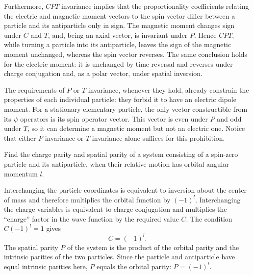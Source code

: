 Furthermore, $CPT$ invariance implies that the proportionality coefficients relating the electric and magnetic moment vectors to the spin vector differ between a particle and its antiparticle only in sign. The magnetic moment changes sign under $C$ and $T$, and, being an axial vector, is invariant under $P$. Hence $CPT$, while turning a particle into its antiparticle, leaves the sign of the magnetic moment unchanged, whereas the spin vector reverses. The same conclusion holds for the electric moment: it is unchanged by time reversal and reverses under charge conjugation and, as a polar vector, under spatial inversion.

The requirements of $P$ or $T$ invariance, whenever they hold, already constrain the properties of each individual particle: they forbid it to have an electric dipole moment. For a stationary elementary particle, the only vector constructible from its $\psi$ operators is its spin operator vector. This vector is even under $P$ and odd under $T$, so it can determine a magnetic moment but not an electric one. Notice that either $P$ invariance or $T$ invariance alone suffices for this prohibition.

\ProblemHeading

Find the charge parity and spatial parity of a system consisting of a spin-zero particle and its antiparticle, when their relative motion has orbital angular momentum $l$.

\SolutionHeading Interchanging the particle coordinates is equivalent to inversion about the center of mass and therefore multiplies the orbital function by $(-1)^l$. Interchanging the charge variables is equivalent to charge conjugation and multiplies the ``charge'' factor in the wave function by the required value $C$. The condition $C(-1)^l=1$ gives
\[
C=(-1)^l.
\]
The spatial parity $P$ of the system is the product of the orbital parity and the intrinsic parities of the two particles. Since the particle and antiparticle have equal intrinsic parities here, $P$ equals the orbital parity: $P=(-1)^l$.
